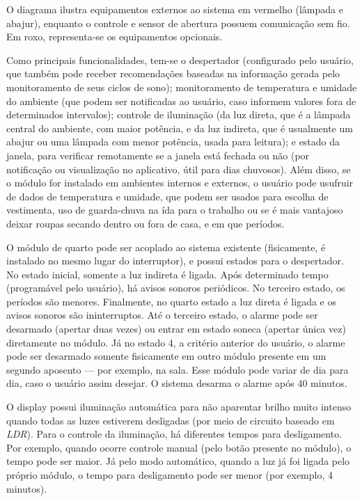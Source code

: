 O diagrama ilustra equipamentos externos ao sistema em vermelho (lâmpada e abajur), enquanto o controle e sensor de abertura possuem comunicação sem fio. Em roxo, representa-se os equipamentos opcionais.

Como principais funcionalidades, tem-se o despertador (configurado pelo usuário, que também pode receber recomendações baseadas na informação gerada pelo monitoramento de seus ciclos de sono); monitoramento de temperatura e umidade do ambiente (que podem ser notificadas ao usuário, caso informem valores fora de determinados intervalos); controle de iluminação (da luz direta, que é a lâmpada central do ambiente, com maior potência, e da luz indireta, que é usualmente um abajur ou uma lâmpada com menor potência, usada para leitura); e estado da janela, para verificar remotamente se a janela está fechada ou não (por notificação ou visualização no aplicativo, útil para dias chuvosos). Além disso, se o módulo for instalado em ambientes internos e externos, o usuário pode usufruir de dados de temperatura e umidade, que podem ser usados para escolha de vestimenta, uso de guarda-chuva na ída para o trabalho ou se é mais vantajoso deixar roupas secando dentro ou fora de casa, e em que períodos.

O módulo de quarto pode ser acoplado ao sistema existente (fisicamente, é instalado no mesmo lugar do interruptor), e possui estados para o despertador. No estado inicial, somente a luz indireta é ligada. Após determinado tempo (programável pelo usuário), há avisos sonoros periódicos. No terceiro estado, os períodos são menores. Finalmente, no quarto estado a luz direta é ligada e os avisos sonoros são ininterruptos. Até o terceiro estado, o alarme pode ser desarmado (apertar duas vezes) ou entrar em estado soneca (apertar única vez) diretamente no módulo. Já no estado 4, a critério anterior do usuário, o alarme pode ser desarmado somente fisicamente em outro módulo presente em um segundo aposento --- por exemplo, na sala. Esse módulo pode variar de dia para dia, caso o usuário assim desejar. O sistema desarma o alarme após 40 minutos.

O display possui iluminação automática para não aparentar brilho muito intenso quando todas as luzes estiverem desligadas (por meio de circuito baseado em \emph{LDR}). Para o controle da iluminação, há diferentes tempos para desligamento. Por exemplo, quando ocorre controle manual (pelo botão presente no módulo), o tempo pode ser maior. Já pelo modo automático, quando a luz já foi ligada pelo próprio módulo, o tempo para desligamento pode ser menor (por exemplo, 4 minutos).

